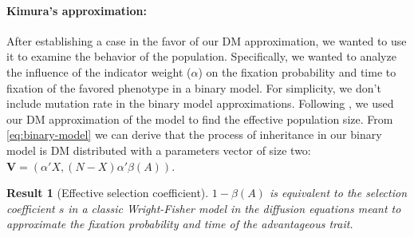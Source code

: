 \documentclass[12pt]{extarticle}
\let\vec\mathbf
\newtheorem{result}{Result}
\begin{document}
\paragraph{Kimura's approximation:}
After establishing a case in the favor of our DM approximation, we wanted to use it to examine the behavior of the population. Specifically, we wanted to analyze the influence of the indicator weight ($\alpha$) on the fixation probability and time to fixation of the favored phenotype in a binary model.
For simplicity, we don't include mutation rate in the binary model approximations.
Following \citet{durret}, we used our DM approximation of the model to find the effective population size. From \cref{eq:binary-model} we can derive that the process of inheritance in our binary model is DM distributed with a parameters vector of size two: $\vec{V}=(\alpha'X,(N-X)\alpha'\beta(A))$.

\begin{result}[Effective selection coefficient]
$1-\beta(A)$ is equivalent to the selection coefficient $s$ in a classic Wright-Fisher model in the diffusion equations meant to approximate the fixation probability and time of the advantageous trait.
\end{result}
\end{document}
